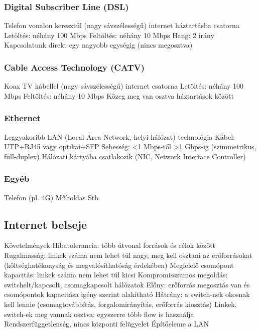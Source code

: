 \documentclass[12pt,a4paper]{article}
\begin{document}
\subsubsection{Digital Subscriber Line (DSL)}

\begin{outline}
	\1 Telefon vonalon keresztül (nagy sávszélességű) internet háztartásba
	 csatorna
		\2 Letöltés: néhány 100 Mbps
		\2 Feltöltés: néhány 10 Mbps
		\2 Hang: 2 irány
	\1 Kapcsolatunk direkt egy nagyobb egységig (nincs megosztva)
\end{outline}

\subsubsection{Cable Access Technology (CATV)}

\begin{outline}
	\1 Koax TV kábellel (nagy sávszélességű) internet
	 csatorna
		\2 Letöltés: néhány 100 Mbps
		\2 Feltöltés: néhány 10 Mbps
	\1 Közeg meg van osztva háztartások között
\end{outline}

\subsubsection{Ethernet}

\begin{outline}
	\1 Leggyakoribb LAN (Local Area Network, helyi hálózat) technológia
	\1 Kábel: UTP+RJ45 vagy optikai+SFP
	\1 Sebesség: <1 Mbps-től >1 Gbps-ig (szimmetrikus, full-duplex)
	\1 Hálózati kártyába csatlakozik (NIC, Network Interface Controller)
\end{outline}

\subsubsection{Egyéb}

\begin{outline}
	\1 Telefon (pl. 4G)
	\1 Műholdas
	\1 Stb.
\end{outline}

\pagebreak

\subsection{Internet belseje}

\begin{outline}
	\1 Követelmények
		\2 Hibatolerancia: több útvonal források és célok között
		\2 Rugalmasság: linkek száma nem lehet túl nagy, meg kell osztani az erőforrásokat (költséghatékonyság és megvalósíthatóság érdekében)
		\2 Megfelelő csomópont kapacitás: linkek száma nem lehet túl kicsi
	\1 Kompromisszumos megoldás: switchelt/kapcsolt, csomagkapcsolt hálózatok
		\2 Előny: erőforrás megosztás van és csomópontok kapacitása igény szerint alakítható
		\2 Hátrány: a switch-nek okosnak kell lennie (csomagtovábbítás, forgalomirányítás, erőforrás kiosztás)
		\2 Linkek, switch-ek meg vannak osztva: egyszerre több flow is használja
	\1 Rendszerfüggetlenség, nincs központi felügyelet
	\1 Építőeleme a LAN
\end{outline}
\end{document}
